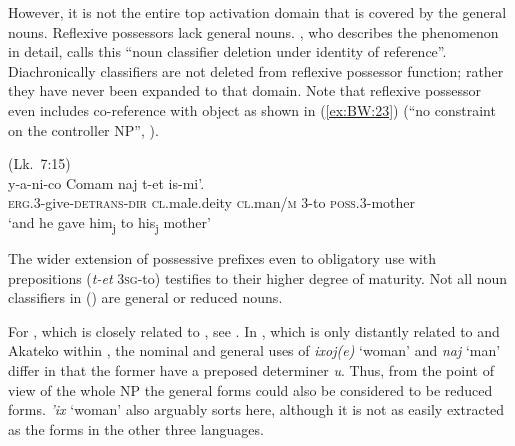 \documentclass[output=collectionpaper]{langsci/langscibook}
\begin{document}
%

However, it is not the entire top activation domain that is covered by the general nouns. Reflexive possessors lack general nouns. \citet[159]{Craig1977}, who describes the phenomenon in detail, calls this “noun classifier deletion under identity of reference”. Diachronically classifiers are not deleted from reflexive possessor function; rather they have never been expanded to that domain. Note that reflexive possessor even includes co-reference with object as shown in (\ref{ex:BW:23}) (“no constraint on the controller NP”, \citealt[152]{Craig1977}).

\eas\label{ex:BW:23}
 (Lk.~7:15)\\
\gll y-a-ni-co	Comam	naj	t-et	is-mi'.\\
\textsc{erg}.3-give-\textsc{detrans-dir}	\textsc{cl}.male.deity	\textsc{cl}.man/\textsc{m}	3-to	\textsc{poss}.3-mother\\
\glt ‘and he gave him\textsubscript{j} to his\textsubscript{j} mother’\\
\zs

The wider extension of possessive prefixes even to obligatory use with prepositions (\textit{t-et} \textsc{3sg}-to) testifies to their higher degree of maturity. Not all noun classifiers in  (\citealt[125]{Day1973}) are general or reduced nouns.

For , which is closely related to , see \citet{Zavala1992}. In  , which is only distantly related to  and Akateko within , the nominal and general uses of \textit{ixoj(e)} ‘woman’ and \textit{naj} ‘man’ differ in that the former have a preposed determiner \textit{u}. Thus, from the point of view of the whole NP the general forms could also be considered to be reduced forms.  \textit{'ix} ‘woman’ also arguably sorts here, although it is not as easily extracted as the forms in the other three  languages.
\end{document}
